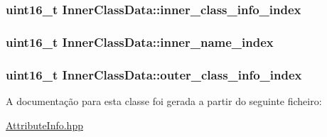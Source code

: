 \subsubsection[{\texorpdfstring{inner\+\_\+class\+\_\+info\+\_\+index}{inner_class_info_index}}]{\setlength{\rightskip}{0pt plus 5cm}uint16\+\_\+t Inner\+Class\+Data\+::inner\+\_\+class\+\_\+info\+\_\+index}\hypertarget{class_inner_class_data_a58436b7ecd12950e542f64ee18906c59}{}\label{class_inner_class_data_a58436b7ecd12950e542f64ee18906c59}
\subsubsection[{\texorpdfstring{inner\+\_\+name\+\_\+index}{inner_name_index}}]{\setlength{\rightskip}{0pt plus 5cm}uint16\+\_\+t Inner\+Class\+Data\+::inner\+\_\+name\+\_\+index}\hypertarget{class_inner_class_data_af11ac765a0638f41283f42eb51b9064a}{}\label{class_inner_class_data_af11ac765a0638f41283f42eb51b9064a}
\subsubsection[{\texorpdfstring{outer\+\_\+class\+\_\+info\+\_\+index}{outer_class_info_index}}]{\setlength{\rightskip}{0pt plus 5cm}uint16\+\_\+t Inner\+Class\+Data\+::outer\+\_\+class\+\_\+info\+\_\+index}\hypertarget{class_inner_class_data_a0370a0b4e7adc2b2524979040dc52f9d}{}\label{class_inner_class_data_a0370a0b4e7adc2b2524979040dc52f9d}


A documentação para esta classe foi gerada a partir do seguinte ficheiro\+:\begin{DoxyCompactItemize}
\item 
\hyperlink{_attribute_info_8hpp}{Attribute\+Info.\+hpp}\end{DoxyCompactItemize}
